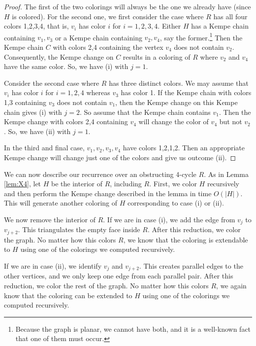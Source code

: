 \documentclass[10pt,a4paper]{article}
\begin{document}
\begin{proof}
The first of the two colorings will always be the one we already have (since $H$ is colored). For the second one,
we first consider the case where $R$ has all four colors 1,2,3,4, that is, $v_i$ has color $i$ for $i=1,2,3,4$. Either $H$ has a Kempe chain containing $v_1,v_3$ or a Kempe chain containing $v_2,v_4$, say the former.\footnote{Because the graph is planar, we cannot have both, and it is a well-known fact that one of them must occur.} Then the Kempe chain $C$ with colors 2,4 containing the vertex $v_4$ does not contain $v_2$. Consequently, the Kempe change on $C$ results in a coloring of $R$ where $v_2$ and $v_4$ have the same color. So, we have (i) with $j=1$.

Consider the second case where $R$ has three distinct colors. We may assume that $v_i$ has color $i$ for $i=1,2,4$ whereas $v_3$ has color 1. If the Kempe chain with colors 1,3 containing $v_3$ does not contain $v_1$, then the Kempe change on this Kempe chain gives (i) with $j=2$. So assume that the Kempe chain contains $v_1$. Then the Kempe change with colors 2,4 containing $v_4$ will change the color of $v_4$ but not $v_2$. So, we have (ii) with $j=1$.

In the third and final case, $v_1,v_2,v_3,v_4$ have colors 1,2,1,2. Then an appropriate Kempe change 
will change just one of the colors and give us outcome (ii).
\end{proof}


We can now describe our recurrence over an obstructing 4-cycle $R$. As in Lemma \ref{lem:X4}, let $H$ be the interior of $R$, including $R$. First, we color $H$ recursively and then perform the Kempe change described in the lemma in time $O(|H|)$. This will generate another coloring of $H$ corresponding to case (i) or (ii).

We now remove the interior of $R$. If we are in case (i), we add the edge from $v_j$ to $v_{j+2}$. This triangulates the empty face inside $R$. After this reduction, we color the graph. No matter how this colors $R$, we know that the coloring is extendable to $H$ using one of the colorings we computed recursively.

If we are in case (ii), we identify $v_j$ and
$v_{j+2}$. This creates parallel edges to the other vertices, and we only keep one edge from each parallel pair. After this reduction, we color the rest of the graph. No matter how this colors $R$, we again know that the coloring can be extended to $H$ using one of the colorings we computed recursively.
\end{document}

